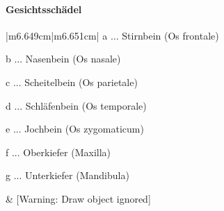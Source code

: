 \documentclass{article}
\newcommand\gZ[1]{\textcolor[rgb]{0.5019608,0.5019608,0.5019608}{#1}}
\begin{document}
\paragraph[Gesichtssch\"adel]{Gesichtssch\"adel}
\begin{center}
\tablehead{}\begin{supertabular}{|m{6.649cm}|m{6.651cm}|}
\hline
{\mdseries a ... Stirnbein \gZ{(Os frontale)}}

{\mdseries b ... Nasenbein \gZ{(Os nasale)}}

{\mdseries c ... Scheitelbein \gZ{(Os parietale)}}

{\mdseries d ... Schl\"afenbein \gZ{(Os temporale)}}

{\mdseries e ... Jochbein \gZ{(Os zygomaticum)}}

{\mdseries f ... Oberkiefer \gZ{(Maxilla)}}

{\mdseries g ... Unterkiefer \gZ{(Mandibula)}}

 &
[Warning: Draw object ignored]

\\\hline
\end{supertabular}
\end{center}
\end{document}

